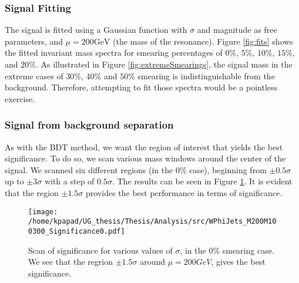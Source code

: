 \subsubsection{Signal Fitting}
\label{sec:org4990f4d}
\label{sec:Signal_fitting}
The signal is fitted using a Gaussian function with \(\sigma\) and magnitude as free parameters, and \(\mu = 200\text{GeV}\) (the mass of the resonance). Figure \ref{fig:fits} shows the fitted invariant mass spectra for smearing percentages of \(0\%\), \(5\%\), \(10\%\), \(15\%\), and \(20\%\). As illustrated in Figure \ref{fig:extremeSmearings}, the signal mass in the extreme cases of \(30\%\text{, }40\%\) and \(50\%\) smearing is indistinguishable from the background. Therefore, attempting to fit those spectra would be a pointless exercise.
\subsubsection{Signal from background separation}
\label{sec:orgcc87bed}
\label{sec:Signal_from_background_separation}
As with the BDT method, we want the region of interest that yields the best significance. To do so, we scan various mass windows around the center of the signal. We scanned six different regions (in the \(0\%\) case), beginning from \(\pm 0.5\sigma\) up to \(\pm 3\sigma\) with a step of \(0.5\sigma\). The results can be seen in Figure \ref{fig:Scan0}. It is evident that the region \(\pm 1.5\sigma\) provides the best performance in terms of significance.
\begin{figure}[h!]
\centering
\texttt{[image: /home/kpapad/UG\_thesis/Thesis/Analysis/src/WPhiJets\_M200M100300\_Significance0.pdf]}
\caption{Scan of significance for various values of $\sigma$, in the $0\%$ smearing case. We see that the regrion $\pm 1.5\sigma$ around $\mu=200GeV$, gives the best significance.}
\label{fig:Scan0}
\end{figure}

